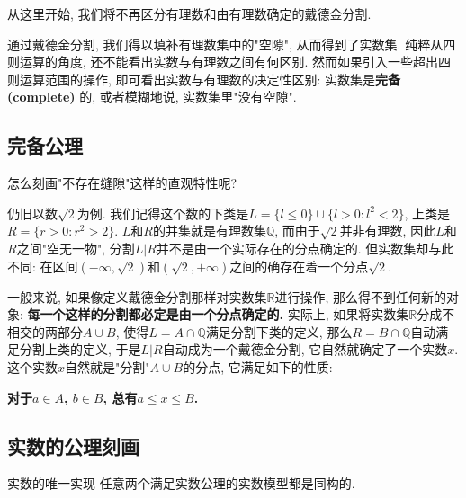 

从这里开始, 我们将不再区分有理数和由有理数确定的戴德金分割. 

通过戴德金分割, 我们得以填补有理数集中的"空隙", 从而得到了实数集. 纯粹从四则运算的角度, 还不能看出实数与有理数之间有何区别. 然而如果引入一些超出四则运算范围的操作, 即可看出实数与有理数的决定性区别: 实数集是\textbf{完备 (complete)} 的, 或者模糊地说, 实数集里"没有空隙".

\subsection{完备公理}

怎么刻画"不存在缝隙"这样的直观特性呢?

仍旧以数$\sqrt{2}$为例. 我们记得这个数的下类是$L=\{l\leq0\}\cup\{l>0:l^2<2\}$, 上类是$R=\{r>0:r^2>2\}$. $L$和$R$的并集就是有理数集$\mathbb{Q}$, 而由于$\sqrt{2}$并非有理数, 因此$L$和$R$之间"空无一物", 分割$L|R$并不是由一个实际存在的分点确定的. 但实数集却与此不同: 在区间$(-\infty,\sqrt{2})$和$(\sqrt{2},+\infty)$之间的确存在着一个分点$\sqrt{2}$. 

一般来说, 如果像定义戴德金分割那样对实数集$\mathbb{R}$进行操作, 那么得不到任何新的对象: \textbf{每一个这样的分割都必定是由一个分点确定的.} 实际上, 如果将实数集$\mathbb{R}$分成不相交的两部分$A\cup B$, 使得$L=A\cap\mathbb{Q}$满足分割下类的定义, 那么$R=B\cap\mathbb{Q}$自动满足分割上类的定义, 于是$L|R$自动成为一个戴德金分割, 它自然就确定了一个实数$x$. 这个实数$x$自然就是"分割"$A\cup B$的分点, 它满足如下的性质:

\textbf{对于$a\in A$, $b\in B$, 总有$a\leq x\leq B$.}

\subsection{实数的公理刻画}

\begin{theorem}{实数的唯一实现}
任意两个满足实数公理的实数模型都是同构的.
\end{theorem}